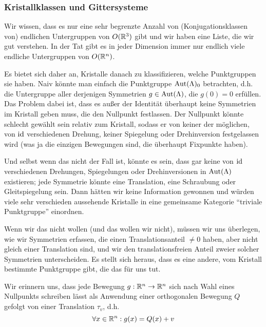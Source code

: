 \subsubsection{Kristallklassen und Gittersysteme}

\begin{remark}
Wir wissen, dass es nur eine sehr begrenzte Anzahl von (Konjugationsklassen von) endlichen Untergruppen von $O(\mathbb{R}^3)$ gibt und wir haben eine Liste, die wir gut verstehen. In der Tat gibt es in jeder Dimension immer nur endlich viele endliche Untergruppen von $O(\mathbb{R}^n)$.

Es bietet sich daher an, Kristalle danach zu klassifizieren, welche Punktgruppen sie haben. Naiv könnte man einfach die Punktgruppe $\operatorname{Aut}(\Lambda)_0$ betrachten, d.h. die Untergruppe aller derjenigen Symmetrien $g\in\operatorname{Aut}(\Lambda)$, die $g(0)=0$ erfüllen. Das Problem dabei ist, dass es außer der Identität überhaupt keine Symmetrien im Kristall geben muss, die den Nullpunkt festlassen. Der Nullpunkt könnte schlecht gewählt sein relativ zum Kristall, sodass er von keiner der möglichen, von $\operatorname{id}$ verschiedenen Drehung, keiner Spiegelung oder Drehinversion festgelassen wird (was ja die einzigen Bewegungen sind, die überhaupt Fixpunkte haben).

Und selbst wenn das nicht der Fall ist, könnte es sein, dass gar keine von $\operatorname{id}$ verschiedenen Drehungen, Spiegelungen oder Drehinversionen in $\operatorname{Aut}(\Lambda)$ existieren; jede Symmetrie könnte eine Translation, eine Schraubung oder Gleitspiegelung sein. Dann hätten wir keine Information gewonnen und würden viele sehr verschieden aussehende Kristalle in eine gemeinsame Kategorie \enquote{triviale Punktgruppe} einordnen.

Wenn wir das nicht wollen (und das wollen wir nicht), müssen wir uns überlegen, wie wir Symmetrien erfassen, die einen Translationsanteil $\neq 0$ haben, aber nicht gleich einer Translation sind, und wir den translationsfreien Anteil zweier solcher Symmetrien unterscheiden. Es stellt sich heraus, dass es eine andere, vom Kristall bestimmte Punktgruppe gibt, die das für uns tut.
\end{remark}

\begin{remark}
Wir erinnern uns, dass jede Bewegung $g:\mathbb{R}^n\to\mathbb{R}^n$ sich nach Wahl eines Nullpunkts schreiben lässt als Anwendung einer orthogonalen Bewegung $Q$ gefolgt von einer Translation $\tau_v$, d.h.
\[\forall x\in\mathbb{R}^n: g(x)=Q(x)+v\]
\end{remark}

